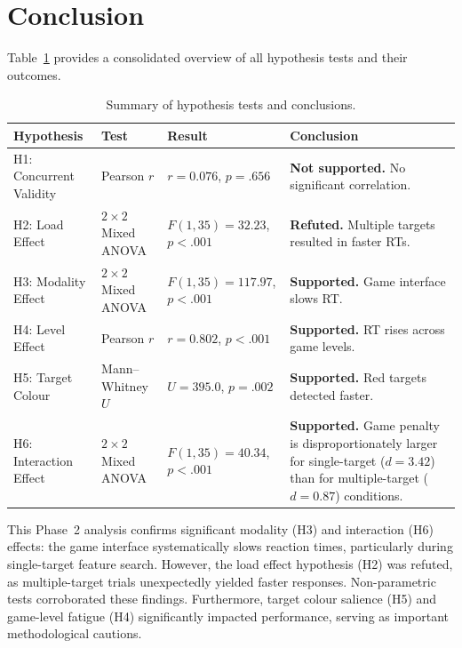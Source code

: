 \documentclass[12pt]{article}
\begin{document}
\section{Conclusion}

Table~\ref{tab:summary} provides a consolidated overview of all hypothesis
tests and their outcomes.

\begin{table}[H]
  \centering
  \caption{Summary of hypothesis tests and conclusions.}
  \label{tab:summary}
  \setlength{\tabcolsep}{4pt}
  \begin{tabular}{p{3.2cm} p{3.5cm} p{3.5cm} p{4.2cm}}
    \toprule
    \textbf{Hypothesis} & \textbf{Test} & \textbf{Result} &
      \textbf{Conclusion} \\
    \midrule
    H1: Concurrent Validity &
      Pearson $r$ &
      $r = 0.076$, $p = .656$ &
      \textbf{Not supported.}  No significant correlation. \\[4pt]

    H2: Load Effect &
      $2 \times 2$ Mixed ANOVA &
      $F(1,35) = 32.23$, $p < .001$ &
      \textbf{Refuted.}  Multiple targets resulted in faster RTs. \\[4pt]

    H3: Modality Effect &
      $2 \times 2$ Mixed ANOVA &
      $F(1,35) = 117.97$, $p < .001$ &
      \textbf{Supported.}  Game interface slows RT. \\[4pt]

    H4: Level Effect &
      Pearson $r$ &
      $r = 0.802$, $p < .001$ &
      \textbf{Supported.}  RT rises across game levels. \\[4pt]

    H5: Target Colour &
      Mann--Whitney $U$ &
      $U = 395.0$, $p = .002$ &
      \textbf{Supported.}  Red targets detected faster. \\[4pt]

    H6: Interaction Effect &
      $2 \times 2$ Mixed ANOVA &
      $F(1,35) = 40.34$, $p < .001$ &
      \textbf{Supported.}  Game penalty is disproportionately
      larger for single-target ($d = 3.42$) than for
      multiple-target ($d = 0.87$) conditions. \\
    \bottomrule
  \end{tabular}
\end{table}

This Phase~2 analysis confirms significant modality (H3) and interaction (H6)
effects: the game interface systematically slows reaction times, particularly
during single-target feature search. However, the load effect hypothesis (H2)
was refuted, as multiple-target trials unexpectedly yielded faster responses.
Non-parametric tests corroborated these findings. Furthermore, target colour
salience (H5) and game-level fatigue (H4) significantly impacted performance,
serving as important methodological cautions.
\end{document}
